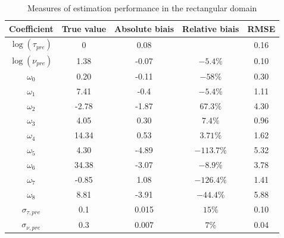 \documentclass[11pt]{article}
\newcommand {\1}{\mathbb{1}}
\begin{document}
\begin{table}[H]
	\centering
	\begin{tabular}{|c|c|c|c|c|}
		\hline
		Coefficient  & True value & Absolute biais  & Relative biais & RMSE\\
		\hline
		$\log(\tau_{pre})$  & 0& 0.08 &  & 0.16\\
		
		$\log(\nu_{pre})$  & 1.38 & -0.07 & $-5.4 \%$ & 0.10 \\
		
		$\omega_0$  &  0.20  & -0.11 & $-58\%$ & 0.30 \\
		
		$\omega_1$  & 7.41 & -0.4 & $-5.4 \%$ & 1.11 \\
		
		$\omega_2$  & -2.78 & -1.87 &  $67.3\%$ & 4.30\\
		
		$\omega_3$  & 4.05 &  0.30 & $7.4\%$ & 0.96\\
		
		$\omega_4$  & 14.34 & 0.53 & $3.71\%$ &  1.62\\
		
		$\omega_5$  & 4.30 & -4.89 & $-113.7\%$ &  5.32\\
	
		$\omega_6$  &  34.38 & -3.07 & $-8.9\%$ &   3.78\\
		
		$\omega_7$  & -0.85 & 1.08 & $-126.4 \%$ & 1.41\\
	
		$\omega_8$  &  8.81 & -3.91 & $-44.4 \%$ & 5.88\\
		
		$\sigma_{\tau,pre}$ & 0.1 & 0.015& $15\%$ & 0.10\\
		
		$\sigma_{\nu,pre}$ & 0.3 & 0.007 & $7 \%$ & 0.04\\
		\hline
	\end{tabular}
	\caption{Measures of estimation performance in the rectangular domain}
	\label{table: estimation performance rect}
\end{table}
\end{document}
